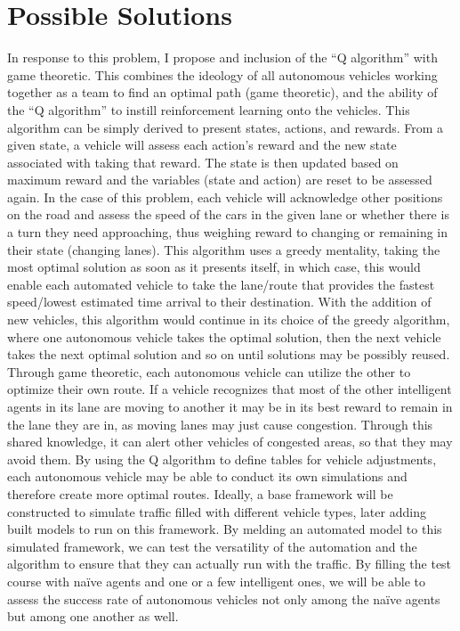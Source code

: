 \documentclass[a4paper, 11pt]{article}
\begin{document}
\section*{Possible Solutions}
In	response to	this	problem,	I	propose	and	inclusion	of	the	“Q	algorithm” with	game	theoretic.	This	
combines	the	ideology	of	all	autonomous	vehicles	working together	as	a	team	to	find	an	optimal	path	(game	
theoretic),	and	the	ability	of	the	“Q	algorithm” to	instill reinforcement	learning	onto	the	vehicles.	
This	algorithm	can	be	simply	derived	to	present	states,	actions,	and	rewards.	From	a	given	state,	a	vehicle	
will	assess	each	action’s	reward	and	the	new	state	associated	with	taking	that	reward.	The	state	is	then	updated	
based	on	maximum reward	and	the	variables	(state	and action)	are	reset	to	be	assessed	again.	In	the	case	of	this	
problem,	each	vehicle	will	acknowledge	other	positions	on	the	road and	assess	the	speed	of	the	cars	in	the	given	
lane	or whether	there	is	a	turn	they	need approaching,	thus	weighing	reward	to	changing	or	remaining	in	their	
state	(changing	lanes).	This	algorithm	uses	a	greedy mentality,	taking	the	most	optimal	solution	as	soon	as	it	
presents	itself,	in	which	case,	this	would	enable	each	automated	vehicle	to	take	the	lane/route	that	provides	the	
fastest	speed/lowest	estimated	time	arrival	to	their	destination. With	the	addition	of	new	vehicles,	this	algorithm	
would	continue	in	its	choice	of the	greedy	algorithm,	where	one	autonomous	vehicle takes	the	optimal	solution,	
then	the	next	vehicle takes	the	next	optimal	solution	and	so	on	until	solutions	may	be	possibly	reused.	
Through	game	theoretic,	each	autonomous	vehicle can	utilize	the other	to	optimize	their	own	route.	If	a	
vehicle	recognizes	that	most	of	the	other	intelligent	agents	in its	lane	are moving	to	another it	may	be	in	its	best	
reward	to	remain	in	the	lane	they	are	in,	as	moving	lanes	may	just	cause	congestion. Through	this	shared	
knowledge,	it	can	alert	other	vehicles	of	congested	areas,	so	that	they	may	avoid	them. By	using	the	Q	algorithm	to	
define	tables	for	vehicle	adjustments,	each	autonomous	vehicle	may	be	able	to	conduct	its	own	simulations	and	
therefore	create	more	optimal	routes.
Ideally,	a	base	framework	will	be	constructed	to	simulate	traffic	filled	with	different	vehicle	types,	later	
adding built	models	to	run	on	this	framework.	By	melding	an	automated model to	this	simulated	framework,	we	
can	test	the	versatility	of	the	automation	and	the	algorithm	to	ensure	that	they	can actually	run	with	the	traffic.	By	
filling	the	test	course	with	naïve agents	and	one	or	a	few	intelligent ones,	we	will	be	able	to	assess	the	success	rate	
of	autonomous	vehicles	not	only	among	the	naïve agents	but	among	one	another	as	well.	
\end{document}
